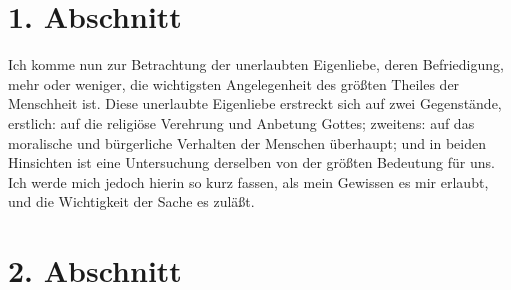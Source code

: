 \section{1. Abschnitt}

Ich komme nun zur Betrachtung der unerlaubten Eigenliebe, deren Befriedigung, mehr oder weniger, die wichtigsten Angelegenheit des größten Theiles der Menschheit ist. Diese unerlaubte Eigenliebe erstreckt sich auf zwei Gegenstände, erstlich: auf die religiöse Verehrung und Anbetung Gottes; zweitens: auf das moralische und bürgerliche Verhalten der Menschen überhaupt; und in beiden Hinsichten ist eine Untersuchung derselben von der größten Bedeutung für uns. Ich werde mich jedoch hierin so kurz fassen, als mein Gewissen es mir erlaubt, und die Wichtigkeit der Sache es zuläßt.

\section{2. Abschnitt}

